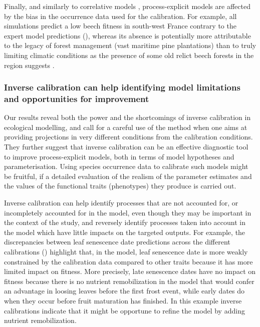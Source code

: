 Finally, and similarly to correlative models \citep{BarbetMassin2010, Duputie2014},  process-explicit models are affected by the bias in the occurrence data used for the calibration. For example, all simulations predict a low beech fitness in south-west France contrary to the expert model predictions (), whereas its absence is potentially more attributable to the legacy of forest management (vast maritime pine plantations) than to truly limiting climatic conditions as the presence of some old relict beech forests in the region suggests \citep{Lafontaine2014}.

\subsubsection{Inverse calibration can help identifying model limitations and opportunities for improvement}

Our results reveal both the power and the shortcomings of inverse calibration in ecological modelling, and call for a careful use of the method when one aims at providing projections in very different conditions from the calibration conditions. They further suggest that inverse calibration can be an effective diagnostic tool to improve  process-explicit models, both in terms of model hypotheses and parameterisation. Using species occurrence data to calibrate such models might be fruitful, if a detailed evaluation of the realism of the parameter estimates and the values of the functional traits (phenotypes) they produce is carried out.

Inverse calibration can help identify processes that are not accounted for, or incompletely accounted for in the model, even though they may be important in the context of the study, and reversely identify processes taken into account in the model which have little impacts on the targeted outputs. For example, the discrepancies between leaf senescence date predictions across the different calibrations () highlight that, in the model, leaf senescence date is more weakly constrained by the calibration data compared to other traits because it has more limited impact on fitness. More precisely, late senescence dates have no impact on fitness because there is no nutrient remobilization in the model that would confer an advantage in loosing leaves before the first frost event, while early dates do when they occur before fruit maturation has finished. In this example inverse calibrations indicate that it might be opportune to refine the model by adding nutrient remobilization.

